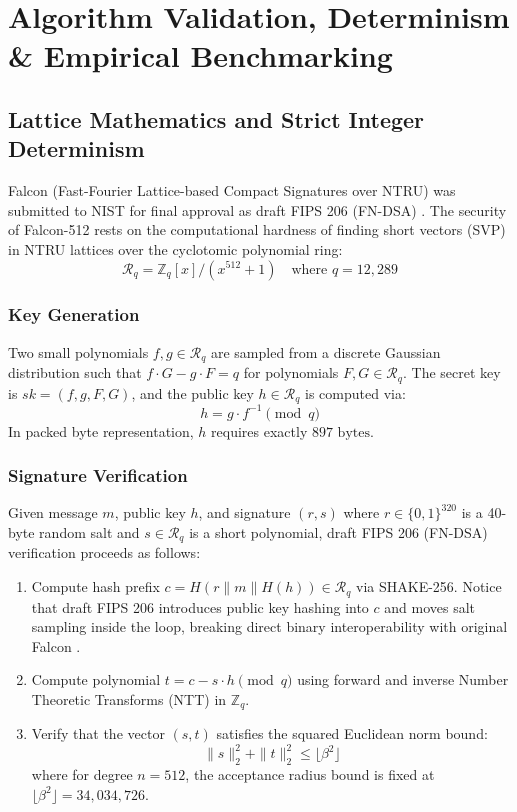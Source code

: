\documentclass[a4paper,fleqn]{cas-dc}
\begin{document}
\section{Algorithm Validation, Determinism \& Empirical Benchmarking}
\label{sec:validation}

\subsection{Lattice Mathematics and Strict Integer Determinism}
Falcon (Fast-Fourier Lattice-based Compact Signatures over NTRU) was submitted to NIST for final approval as draft FIPS 206 (FN-DSA) \citep{fouque2018falcon, nist2024fips206}. The security of Falcon-512 rests on the computational hardness of finding short vectors (SVP) in NTRU lattices over the cyclotomic polynomial ring:
\begin{equation}
    \mathcal{R}_q = \mathbb{Z}_q[x] / (x^{512} + 1) \quad \text{where } q = 12,289
    \label{eq:ntru_ring}
\end{equation}

\subsubsection{Key Generation}
Two small polynomials $f, g \in \mathcal{R}_q$ are sampled from a discrete Gaussian distribution such that $f \cdot G - g \cdot F = q$ for polynomials $F, G \in \mathcal{R}_q$. The secret key is $sk = (f, g, F, G)$, and the public key $h \in \mathcal{R}_q$ is computed via:
\begin{equation}
    h = g \cdot f^{-1} \pmod q
    \label{eq:pubkey_gen}
\end{equation}
In packed byte representation, $h$ requires exactly $897\text{ bytes}$.

\subsubsection{Signature Verification}
Given message $m$, public key $h$, and signature $(r, s)$ where $r \in \{0, 1\}^{320}$ is a 40-byte random salt and $s \in \mathcal{R}_q$ is a short polynomial, draft FIPS 206 (FN-DSA) verification proceeds as follows:
\begin{enumerate}
    \item Compute hash prefix $c = H(r \parallel m \parallel H(h)) \in \mathcal{R}_q$ via SHAKE-256. Notice that draft FIPS 206 introduces public key hashing into $c$ and moves salt sampling inside the loop, breaking direct binary interoperability with original Falcon \citep{fouque2018falcon}.
    \item Compute polynomial $t = c - s \cdot h \pmod q$ using forward and inverse Number Theoretic Transforms (NTT) in $\mathbb{Z}_q$.
    \item Verify that the vector $(s, t)$ satisfies the squared Euclidean norm bound:
    \begin{equation}
        \|s\|_2^2 + \|t\|_2^2 \le \lfloor \beta^2 \rfloor
        \label{eq:norm_bound}
    \end{equation}
    where for degree $n = 512$, the acceptance radius bound is fixed at $\lfloor \beta^2 \rfloor = 34,034,726$.
\end{enumerate}
\end{document}
